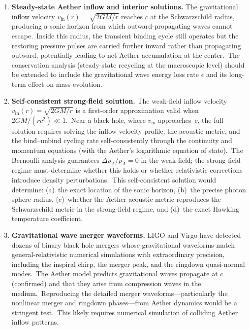 ﻿\documentclass[12pt,letterpaper]{article}
\newcommand{\rhoa}{\rho_{\!A}}
\newcommand{\vin}{v_{\mathrm{in}}}
\begin{document}
\begin{enumerate}[leftmargin=2em]
  \item \textbf{Steady-state Aether inflow and interior solutions.} The gravitational inflow velocity
    $\vin(r) = \sqrt{2GM/r}$ reaches $c$ at the Schwarzschild radius, producing a sonic horizon
    from which outward-propagating waves cannot escape.\ Inside this radius, the transient
    binding cycle still operates but the restoring pressure pulses are carried further
    inward rather than propagating outward, potentially leading to net Aether accumulation
    at the center.\ The conservation analysis (steady-state recycling at the macroscopic
    level) should be extended to include the gravitational wave energy loss rate $\epsilon$
    and its long-term effect on mass evolution.

  \item \textbf{Self-consistent strong-field solution.} The weak-field inflow velocity
    $\vin(r) = \sqrt{2GM/r}$ is a first-order approximation valid when
    $2GM/(rc^2) \ll 1$.\ Near a black hole, where $\vin$ approaches~$c$,
    the full solution requires solving the inflow velocity profile, the
    acoustic metric, and the bind--unbind cycling rate self-consistently
    through the continuity and momentum equations (with the Aether's
    logarithmic equation of state).\ The Bernoulli analysis guarantees
    $\Delta\rhoa/\rhoa = 0$ in the weak field; the strong-field regime
    must determine whether this holds or whether relativistic corrections
    introduce density perturbations.\ This self-consistent solution would
    determine: (a)~the exact location of the sonic horizon, (b)~the precise
    photon sphere radius, (c)~whether the Aether acoustic metric reproduces the
    Schwarzschild metric in the strong-field regime, and (d)~the exact Hawking
    temperature coefficient.

  \item \textbf{Gravitational wave merger waveforms.} LIGO and Virgo \cite{ligo2016} have detected dozens of binary
    black hole mergers whose gravitational waveforms match general-relativistic numerical
    simulations with extraordinary precision, including the inspiral chirp, the merger
    peak, and the ringdown quasi-normal modes.\ The Aether model predicts gravitational
    waves propagate at $c$ (confirmed) and that they arise from compression waves in the
    medium.\ Reproducing the detailed merger waveforms---particularly the nonlinear merger
    and ringdown phases---from Aether dynamics would be a stringent test.\ This likely
    requires numerical simulation of colliding Aether inflow patterns.



\end{enumerate}
\end{document}
